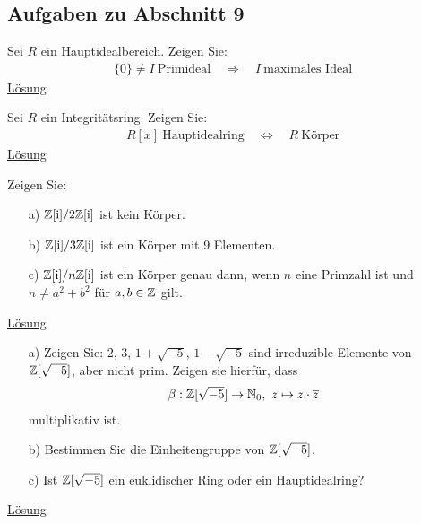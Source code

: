 \subsection{Aufgaben zu Abschnitt 9}

\begin{exe}\label{aufgabe:9.1}
	Sei $ R $ ein Hauptidealbereich.
	Zeigen Sie:
	\begin{align*}
	\lbrace 0 \rbrace \neq 	I \ \text{Primideal} \quad 
	\Rightarrow \quad
	I \ \text{maximales Ideal}
	\end{align*}
	\hyperlink{loes:9.1}{Lösung}
\end{exe}

\begin{exe}\label{aufgabe:9.2}
	Sei $ R $ ein Integritätsring. Zeigen Sie:
	\begin{align*}
	R[x] \ \text{Hauptidealring}
	\quad
	\Leftrightarrow
	\quad
	R \ \text{Körper}
	\end{align*}
	\hyperlink{loes:9.2}{Lösung}
\end{exe}

\begin{exe}\label{aufgabe:9.3}
	Zeigen Sie:
	\begin{enumerate}
		\item[a)]
		$ \mathbb{Z}[\textrm{i}] / 2\mathbb{Z}[\textrm{i}] $ ist kein Körper.
		
		\item[b)] 
		$ \mathbb{Z}[\textrm{i}] / 3\mathbb{Z}[\textrm{i}] $ ist ein Körper mit 9 Elementen.
		
		\item[c)] 
		$ \mathbb{Z}[\textrm{i}] / n\mathbb{Z}[\textrm{i}] $ ist ein Körper genau dann,
		wenn $ n $ eine Primzahl ist und $ n \neq a^2 + b^2  $ für $ a,b \in \mathbb{Z} $ gilt.
	\end{enumerate}
	\hyperlink{loes:9.3}{Lösung}
\end{exe}

\begin{exe}\label{aufgabe:9.4}
	\begin{enumerate}
		\item[a)]
		Zeigen Sie:
		$ 2 $, $ 3 $, $ 1+ \sqrt{-5} $, $ 1 - \sqrt{-5} $ 
		sind irreduzible Elemente von $ \mathbb{Z}[\sqrt{-5}] $, aber nicht prim.
		Zeigen sie hierfür, dass
		\begin{align*}
		\beta : \mathbb{Z}[\sqrt{-5}] \to \mathbb{N}_0, \ z \mapsto z \cdot \overline{z}
		\end{align*}
		multiplikativ ist.
		
		\item[b)] 
		Bestimmen Sie die Einheitengruppe von $ \mathbb{Z}[\sqrt{-5}] $.
		
		\item[c)]
		Ist $ \mathbb{Z}[\sqrt{-5}] $ ein euklidischer Ring oder ein Hauptidealring?   
	\end{enumerate}
	\hyperlink{loes:9.4}{Lösung}
\end{exe}

